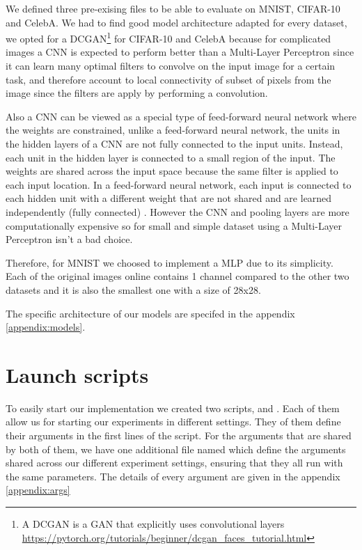 We defined three pre-exising files to be able to evaluate on MNIST, CIFAR-10 and CelebA. We had to find good model architecture adapted for every dataset, we opted for a DCGAN\footnote{A DCGAN is a GAN that explicitly uses convolutional layers \url{https://pytorch.org/tutorials/beginner/dcgan_faces_tutorial.html}} for CIFAR-10 and CelebA because for complicated images a CNN is expected to perform better than a Multi-Layer Perceptron since it can learn many optimal filters to convolve on the input image for a certain task, and therefore account to local connectivity of subset of pixels from the image since the filters are apply by performing a convolution.

Also a CNN can be viewed as a special type of feed-forward neural network where the weights are constrained, unlike a feed-forward neural network, the units in the hidden layers of a CNN are not fully connected to the input units. Instead, each unit in the hidden layer is connected to a small region of the input. The weights are shared across the input space because the same filter is applied to each input location. In a feed-forward neural network, each input is connected to each hidden unit with a different weight that are not shared and are learned independently (fully connected) \cite{james2023introduction}. However the CNN and pooling layers are more computationally expensive so for small and simple dataset using a Multi-Layer Perceptron isn't a bad choice.


Therefore, for MNIST we choosed to implement a MLP due to its simplicity. Each of the original images online contains 1 channel compared to the other two datasets and it is also the smallest one with a size of 28x28.

The specific architecture of our models are specifed in the appendix \ref{appendix:models}.

\section{Launch scripts}
To easily start our implementation we created two scripts,  and . Each of them allow us for starting our experiments in different settings. They of them define their arguments in the first lines of the script. For the arguments that are shared by both of them, we have one additional file named  which define the arguments shared across our different experiment settings, ensuring that they all run with the same parameters. The details of every argument are given in the appendix \ref{appendix:args}

